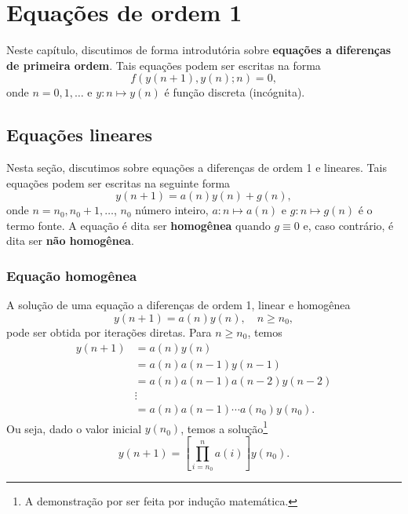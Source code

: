 
\chapter{Equações de ordem 1}\label{cap_ead1}

Neste capítulo, discutimos de forma introdutória sobre {\bf equações a diferenças de primeira ordem}. Tais equações podem ser escritas na forma
\begin{equation}
  f\left(y(n+1),y(n);n\right)=0,
\end{equation}
onde $n=0, 1, \ldots$ e $y:n\mapsto y(n)$ é função discreta (incógnita).

\section{Equações lineares}\label{cap_ead1_sec_eqlin}

Nesta seção, discutimos sobre equações a diferenças de ordem 1 e lineares. Tais equações podem ser escritas na seguinte forma
\begin{equation}
  y(n+1) = a(n)y(n) + g(n),
\end{equation}
onde $n=n_0, n_0+1, \ldots$, $n_0$ número inteiro, $a:n\mapsto a(n)$ e $g:n\mapsto g(n)$ é o termo fonte. A equação é dita ser {\bf homogênea} quando $g\equiv 0$ e, caso contrário, é dita ser {\bf não homogênea}.

\subsection{Equação homogênea}

A solução de uma equação a diferenças de ordem 1, linear e homogênea
\begin{equation}\label{eq:ead1_linear_eqh}
  y(n+1) = a(n)y(n),\quad n\geq n_0,
\end{equation}
pode ser obtida por iterações diretas. Para $n\geq n_0$, temos
\begin{align}
  y(n+1) &= a(n)y(n) \\
          &= a(n)a(n-1)y(n-1)\\
          &= a(n)a(n-1)a(n-2)y(n-2) \\
          &\vdots\\
          &= a(n)a(n-1)\cdots a(n_0)y(n_0).
\end{align}
Ou seja, dado o valor inicial $y(n_0)$, temos a solução\footnote{A demonstração por ser feita por indução matemática.}
\begin{equation}\label{eq:ead1_linear_eqh_sol}
  y(n+1) = \left[\prod_{i=n_0}^{n}a(i)\right]y(n_0).
\end{equation}

